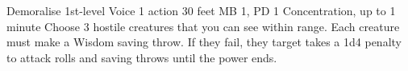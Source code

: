 \DndPowerHeader%
  {Demoralise}
  {1st-level Voice}
  {1 action}
  {30 feet}
  {MB 1, PD 1}
  {Concentration, up to 1 minute}
Choose 3 hostile creatures that you can see within range.
Each creature must make a Wisdom saving throw.
If they fail, they target takes a 1d4 penalty to attack rolls and
saving throws until the power ends.
